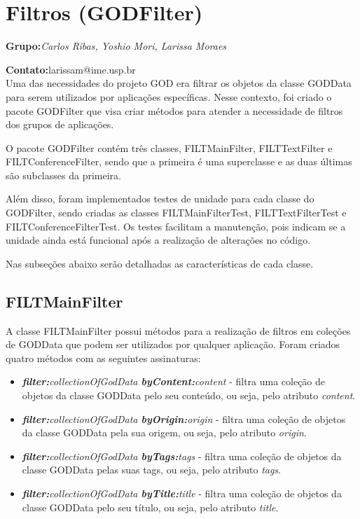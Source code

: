 \section{Filtros (GODFilter)}

\textbf{Grupo:}\textit{Carlos Ribas, Yoshio Mori, Larissa Moraes}

\textbf{Contato:}larissam@ime.usp.br\\

Uma das necessidades do projeto GOD era filtrar os objetos da classe GODData para serem utilizados por aplicações específicas. Nesse contexto, foi criado o pacote GODFilter que visa criar métodos para atender a necessidade de filtros dos grupos de aplicações.

O pacote GODFilter contém três classes, FILTMainFilter, FILTTextFilter e FILTConferenceFilter, sendo que a primeira é uma superclasse e as duas últimas são subclasses da primeira. 

Além disso, foram implementados testes de unidade para cada classe do GODFilter, sendo criadas as classes FILTMainFilterTest, FILTTextFilterTest e FILTConferenceFilterTest. Os testes facilitam a manutenção, pois indicam se a unidade ainda está funcional após a realização de alterações no código.

Nas subseções abaixo serão detalhadas as características de cada classe.

\subsection{FILTMainFilter}

A classe FILTMainFilter possui métodos para a realização de filtros em coleções de GODData que podem ser utilizados por qualquer aplicação. 
Foram criados quatro métodos com as seguintes assinaturas:

\begin{itemize}

\item \textit{\textbf{filter:}collectionOfGodData \textbf{byContent:}content} - filtra uma coleção de objetos da classe GODData pelo seu conteúdo, ou seja, pelo atributo \textit{content}.

\item \textit{\textbf{filter:}collectionOfGodData \textbf{byOrigin:}origin} - filtra uma coleção de objetos da classe GODData pela sua origem, ou seja, pelo atributo \textit{origin}.

\item \textit{\textbf{filter:}collectionOfGodData \textbf{byTags:}tags} - filtra uma coleção de objetos da classe GODData pelas suas tags, ou seja, pelo atributo \textit{tags}.

\item \textit{\textbf{filter:}collectionOfGodData \textbf{byTitle:}title} - filtra uma coleção de objetos da classe GODData pelo seu título, ou seja, pelo atributo \textit{title}.

\end{itemize}

